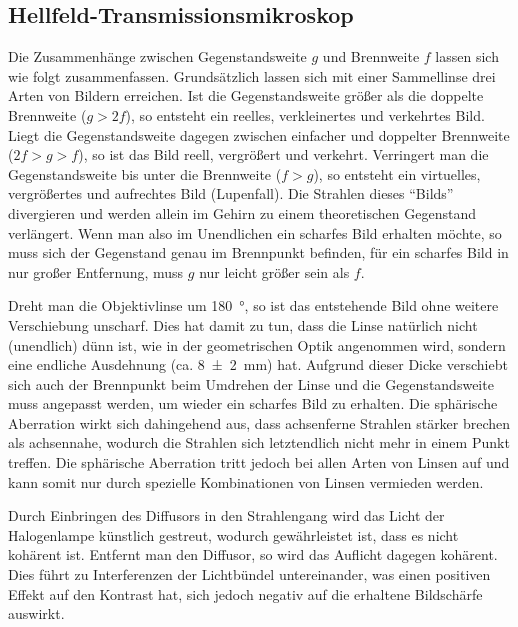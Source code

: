 \documentclass[english, ngerman]{scrartcl}
\begin{document}
\subsection{Hellfeld-Transmissionsmikroskop}
\label{subsec:diskussion_hellfeld}

Die Zusammenhänge zwischen Gegenstandsweite $g$ und Brennweite $f$ lassen sich wie folgt zusammenfassen.
Grundsätzlich lassen sich mit einer Sammellinse drei Arten von Bildern erreichen. Ist die Gegenstandsweite größer als die doppelte Brennweite ($g>2f$), so entsteht ein reelles, verkleinertes und verkehrtes Bild. Liegt die Gegenstandsweite dagegen zwischen einfacher und doppelter Brennweite ($2f>g>f$), so ist das Bild reell, vergrößert und verkehrt. Verringert man die Gegenstandsweite bis unter die Brennweite ($f>g$), so entsteht ein virtuelles, vergrößertes und aufrechtes Bild (Lupenfall). Die Strahlen dieses \enquote{Bilds} divergieren und werden allein im Gehirn zu einem theoretischen Gegenstand verlängert. Wenn man also im Unendlichen ein scharfes Bild erhalten möchte, so muss sich der Gegenstand genau im Brennpunkt befinden, für ein scharfes Bild in nur großer Entfernung, muss $g$ nur leicht größer sein als $f$.

Dreht man die Objektivlinse um \SI{180}{\degree}, so ist das entstehende Bild ohne weitere Verschiebung unscharf. Dies hat damit zu tun, dass die Linse natürlich nicht (unendlich) dünn ist, wie in der geometrischen Optik angenommen wird, sondern eine endliche Ausdehnung (ca. \SI{8(2)}{mm}) hat. Aufgrund dieser Dicke verschiebt sich auch der Brennpunkt beim Umdrehen der Linse und die Gegenstandsweite muss angepasst werden, um wieder ein scharfes Bild zu erhalten. Die sphärische Aberration wirkt sich dahingehend aus, dass achsenferne Strahlen stärker brechen als achsennahe, wodurch die Strahlen sich letztendlich nicht mehr in einem Punkt treffen. Die sphärische Aberration tritt jedoch bei allen Arten von Linsen auf und kann somit nur durch spezielle Kombinationen von Linsen vermieden werden.

Durch Einbringen des Diffusors in den Strahlengang wird das Licht der Halogenlampe künstlich gestreut, wodurch gewährleistet ist, dass es nicht kohärent ist. Entfernt man den Diffusor, so wird das Auflicht dagegen kohärent. Dies führt zu Interferenzen der Lichtbündel untereinander, was einen positiven Effekt auf den Kontrast hat, sich jedoch negativ auf die erhaltene Bildschärfe auswirkt.
\end{document}
